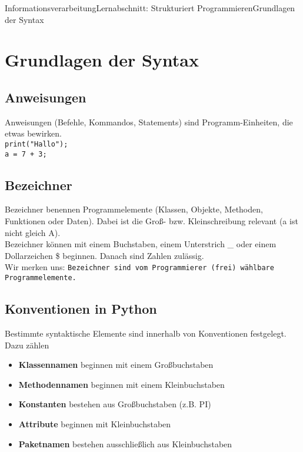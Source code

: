 \documentclass[11pt,oneside,openany,headings=optiontotoc,11pt,numbers=noenddot]{article}
\begin{document}
	\begin{worksheet}{Informationsverarbeitung}{Lernabschnitt: Strukturiert Programmieren}{Grundlagen der Syntax}
		\setlength{\columnseprule}{0pt}
		\setcounter{section}{3}
		\setcounter{page}{12}
		\section{Grundlagen der Syntax}
		\subsection{Anweisungen}
		Anweisungen (Befehle, Kommandos, Statements) sind Programm-Einheiten, die \grqq{}etwas bewirken\grqq{}.\\
		\lstinline[style=Python]|print("Hallo");|\\
		\lstinline[style=Python]|a = 7 + 3;|
		
		\subsection{Bezeichner}
		Bezeichner benennen Programmelemente (Klassen, Objekte, Methoden, Funktionen oder Daten). Dabei ist die Groß- bzw. Kleinschreibung relevant (a ist nicht gleich A).\\
		Bezeichner können mit einem Buchstaben, einem Unterstrich \_ oder einem Dollarzeichen \$ beginnen. Danach sind Zahlen zulässig.\\
		Wir merken uns: \texttt{Bezeichner sind vom Programmierer (frei) wählbare Programmelemente.}
		
		\subsection{Konventionen in Python}
		Bestimmte syntaktische Elemente sind innerhalb von Konventionen festgelegt. Dazu zählen
		\begin{itemize}
			\item \textbf{Klassennamen} beginnen mit einem Großbuchstaben
			\item \textbf{Methodennamen} beginnen mit einem Kleinbuchstaben
			\item \textbf{Konstanten} bestehen aus Großbuchstaben (z.B. PI)
			\item \textbf{Attribute} beginnen mit Kleinbuchstaben
			\item \textbf{Paketnamen} bestehen ausschließlich aus Kleinbuchstaben
		\end{itemize}
		

\end{worksheet}
\end{document}
